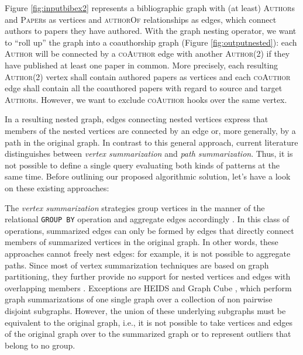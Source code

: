 \begin{example}[label=ex:nestingbib]
	Figure \ref{fig:inputbibex2} represents a bibliographic graph with (at least) \textsc{Author}s and \textsc{Paper}s as vertices and \textsc{authorOf} relationships as edges, which connect authors to papers they have authored. With the graph nesting operator, we want to ``roll up'' the graph into a coauthorship graph (Figure \ref{fig:outputnested}):  each \textsc{Author} will be connected by a \textsc{coAuthor} edge with another \textsc{Author}(2) if they have published at least one paper in common.
	More precisely, each resulting \textsc{Author}(2) vertex shall contain authored papers as vertices and each \textsc{coAuthor} edge shall contain all the coauthored papers with regard to source and target \textsc{Author}s. However, we want to exclude \textsc{coAuthor} hooks over the same vertex.
\end{example}

In a resulting nested graph, edges connecting nested vertices express that members of the nested vertices are connected by an edge or, more generally, by a path in the original graph.
In contrast to this general approach, current literature distinguishes between \textit{vertex summarization} and \textit{path summarization}. Thus, it is not possible to define a single query evaluating both kinds of patterns at the same time. Before outlining our proposed algorithmic solution, let's have a look on these existing approaches:

The \textit{vertex summarization} strategies group vertices in the manner of the relational \texttt{GROUP BY} operation and aggregate edges accordingly \cite{JunghannsPR17}. In this class of operations, summarized edges can only be formed by edges that directly connect members of summarized vertices in the original graph. In other words, these approaches cannot freely nest edges: for example, it is not possible to aggregate paths. Since most of vertex summarization techniques are based on graph partitioning, they further provide no support for nested vertices and edges with overlapping members \cite{yin,Tian20085,jakawat}.
Exceptions are HEIDS \cite{ChengJQ16} and Graph Cube \cite{Zhao11}, which perform graph summarizations of one single graph over a collection of non pairwise disjoint subgraphs. However, the union of these underlying subgraphs must be equivalent to the original graph, i.e., it is not possible to take vertices and edges of the original graph over to the summarized graph or to represent outliers that belong to no group.

